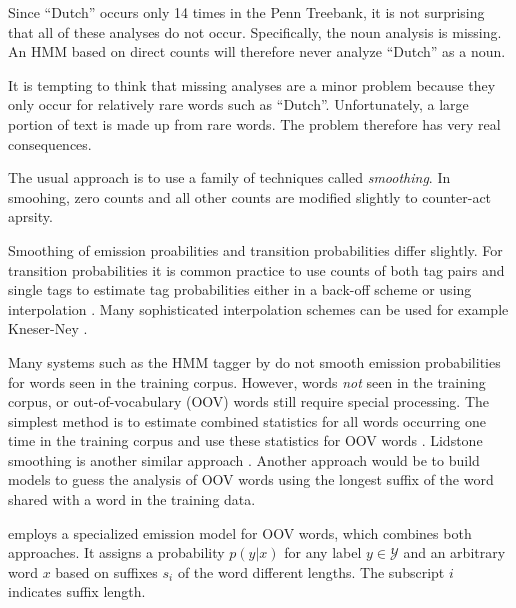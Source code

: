 Since ``Dutch'' occurs only 14 times in the Penn Treebank, it is not
surprising that all of these analyses do not occur. Specifically, the
noun analysis is missing. An HMM based on direct counts will therefore
never analyze ``Dutch'' as a noun.

It is tempting to think that missing analyses are a minor problem
because they only occur for relatively rare words such as
``Dutch''. Unfortunately, a large portion of text is made up from rare
words. The problem therefore has very real consequences.

The usual approach is to use a family of techniques called {\it
  smoothing}. In smoohing, zero counts and all other counts are
modified slightly to counter-act aprsity.

Smoothing of emission proabilities and transition probabilities differ
slightly. For transition probabilities it is common practice to use
counts of both tag pairs and single tags to estimate tag probabilities
either in a back-off scheme \citep{foo} or using interpolation
\citep{Brants2000}. Many sophisticated interpolation schemes can be
used for example Kneser-Ney \citep{foo}.

Many systems such as the HMM tagger by \cite{Brants2000} do not smooth
emission probabilities for words seen in the training corpus. However,
words {\it not} seen in the training corpus, or out-of-vocabulary
(OOV) words still require special processing. The simplest method is
to estimate combined statistics for all words occurring one time in
the training corpus and use these statistics for OOV words
\citep{foo}. Lidstone smoothing is another similar approach
\citep{foo}. Another approach would be to build models to guess the
analysis of OOV words using the longest suffix of the word shared with
a word in the training data.

\cite{Brants2000} employs a specialized emission model for OOV words,
which combines both approaches. It assigns a probability $p(y|x)$ for
any label $y \in \mathcal{Y}$ and an arbitrary word $x$ based on
suffixes $s_i$ of the word different lengths. The subscript $i$
indicates suffix length.

